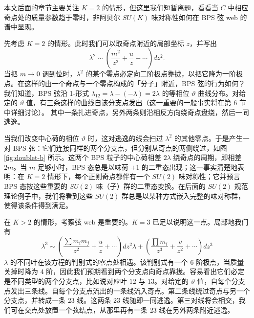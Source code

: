 本文后面的章节主要关注 $K=2$ 的情形，但这里我们短暂离题，看看当 $C$ 中相应奇点处的质量参数趋于零时，非阿贝尔 $SU(K)$ 味对称性如何在 BPS 弦 web 的谱中显现。

先考虑 $K=2$ 的情形。此时我们可以取奇点附近的局部坐标 $z$，并写出
\begin{equation}
\lambda^2 \sim \left (\frac{m^2}{z^2} + \frac{u}{z} + \cdots \right) dz^2.
\end{equation}
当把 $m \to 0$ 调到位时，$\lambda^2$ 的某个零点必定向二阶极点靠拢，以把它降为一阶极点。在这样的由一个奇点与一个零点构成的「分子」附近，BPS 弦的行为如何？我们知道，BPS 弦沿 1-形式 $\lambda_{12} = \lambda - (-\lambda) = 2 \lambda$ 的等相位 $\vartheta$ 曲线分布。对给定的 $\vartheta$ 值，有三条这样的曲线自该分支点发出（这一重要的一般事实将在第 6 节中详细讨论）。%
其中一条扎进奇点，另外两条则沿相反方向绕奇点盘绕，然后一同逃逸。



当我们改变中心荷的相位 $\vartheta$ 时，这对逃逸的线会扫过 $\lambda^2$ 的其他零点。于是产生一对 BPS 弦：它们连接同样的两个分支点，但分别从奇点的两侧绕过，如图 \ref{fig:doublet-b} 所示。这两个 BPS 粒子的中心荷相差 $2 \lambda$ 绕奇点的周期，即相差 $2m$。当 $m$ 足够小时，BPS 态总是以味荷 $\pm 1$ 的二重态出现；这一事实清楚地表明：在 $K=2$ 情形下，每个正则奇点都伴有一个 $SU(2)$ 味对称性；它并预言 BPS 态按这些重要的 $SU(2)$ 味（子）群的二重态变换。在后面的 $SU(2)$ 规范理论例子中，我们将看到这些 $SU(2)$ 群总是以某种方式嵌入完整的味对称群，使得该条件得到满足。

在 $K > 2$ 的情形，考察弦 web 是重要的。$K=3$ 已足以说明这一点。局部地我们有
\begin{equation}
\lambda^3 \sim \left (\frac{\sum m_i m_j}{z^2} + \frac{u}{z} + \cdots \right) dz^2 \lambda+ \left (\frac{\prod m_i}{z^3} + \frac{v}{z^2} + \cdots \right) dz^3
\end{equation}
$\lambda$ 的不同叶在该方程的判别式的零点处相遇。该判别式有一个 $6$ 阶极点，当质量关掉时降为 $4$ 阶，因此我们预期看到两个分支点向奇点靠拢。容易看出它们必定是不同类型的两个分支点，比如说对应叶 $12$ 与 $13$。对给定的 $\vartheta$ 值，自每个分支点发出三条线。自每个分支点流出的一条线流入奇点。第二条线绕过奇点与另一个分支点，并转成一条 $23$ 线。这两条 $23$ 线随即一同逃逸。第三对线将会相交，我们可在交点处放置一个弦结点，从那里再有一条 $23$ 线在另外两条附近逃逸。

